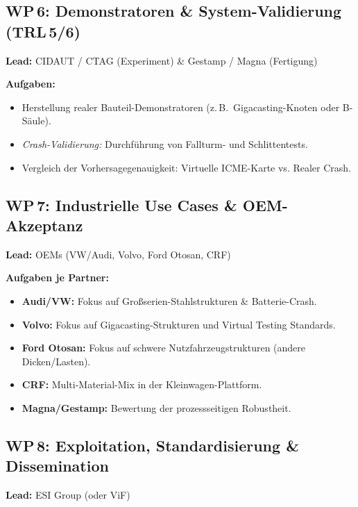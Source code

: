 \documentclass[12pt,a4paper]{article}
\begin{document}
\subsection{WP\,6: Demonstratoren \& System-Validierung (TRL\,5/6)}
\textbf{Lead:} CIDAUT / CTAG (Experiment) \& Gestamp / Magna (Fertigung)

\textbf{Aufgaben:}
\begin{itemize}[leftmargin=*]
  \item Herstellung realer Bauteil-Demonstratoren (z.\,B.\ Gigacasting-Knoten
        oder B-Säule).
  \item \emph{Crash-Validierung:} Durchführung von Fallturm- und
        Schlittentests.
  \item Vergleich der Vorhersagegenauigkeit: Virtuelle ICME-Karte vs.
        Realer Crash.
\end{itemize}

\subsection{WP\,7: Industrielle Use Cases \& OEM-Akzeptanz}
\textbf{Lead:} OEMs (VW/Audi, Volvo, Ford Otosan, CRF)

\textbf{Aufgaben je Partner:}
\begin{itemize}[leftmargin=*]
  \item \textbf{Audi/VW:} Fokus auf Großserien-Stahlstrukturen \&
        Batterie-Crash.
  \item \textbf{Volvo:} Fokus auf Gigacasting-Strukturen und Virtual Testing
        Standards.
  \item \textbf{Ford Otosan:} Fokus auf schwere Nutzfahrzeugstrukturen
        (andere Dicken/Lasten).
  \item \textbf{CRF:} Multi-Material-Mix in der Kleinwagen-Plattform.
  \item \textbf{Magna/Gestamp:} Bewertung der prozessseitigen Robustheit.
\end{itemize}

\subsection{WP\,8: Exploitation, Standardisierung \& Dissemination}
\textbf{Lead:} ESI Group (oder ViF)
\end{document}
